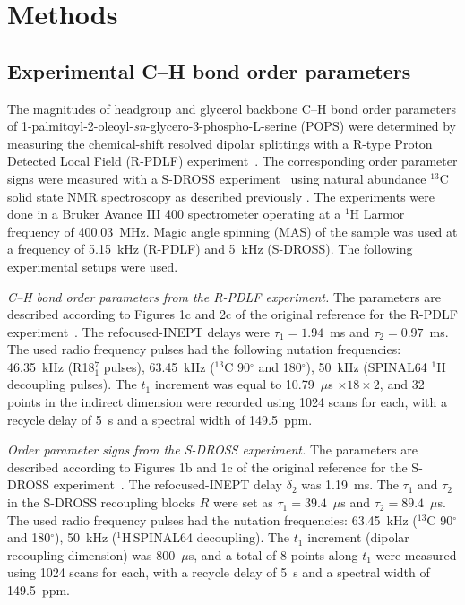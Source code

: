 \documentclass[journal=jpcbfk,manuscript=article]{achemso}
\begin{document}
\section{Methods}

\subsection{Experimental C--H bond order parameters}

The magnitudes of headgroup and glycerol backbone C--H bond order parameters of 1-palmitoyl-2-oleoyl-{\it sn}-glycero-3-phospho-L-serine (POPS)
were determined by measuring the chemical-shift resolved dipolar splittings
with a R-type Proton Detected Local Field (R-PDLF) experiment~\cite{dvinskikh04}.
The corresponding order parameter signs were measured with a S-DROSS experiment~\cite{gross97}
using natural abundance $^{13}$C solid state NMR spectroscopy as described previously \cite{ferreira13,ferreira16}.
The experiments were done in a Bruker Avance III 400 spectrometer operating at a $^1$H Larmor frequency of 400.03~MHz.
Magic angle spinning (MAS) of the sample was used at a frequency of 5.15~kHz (R-PDLF) and 5~kHz (S-DROSS).
The following experimental setups were used.

{\emph{C--H bond order parameters from the R-PDLF experiment.}} The parameters are described according to Figures 1c and 2c of the original reference
for the R-PDLF experiment~\cite{dvinskikh04}.  The refocused-INEPT delays were $\tau_1=1.94$~ms and $\tau_2=0.97$~ms.
The used radio frequency pulses had the following nutation frequencies: 46.35~kHz (R18$^7_1$ pulses), 63.45~kHz ($^{13}$C 90$^{\circ}$ and 180$^{\circ}$),
50~kHz (SPINAL64 $^1$H decoupling pulses).
The $t_1$ increment was equal to 10.79~$\mu$s $\times18\times2$, and 32 points in the indirect
dimension were recorded using 1024 scans for each, with a recycle delay of 5~s and a spectral width of 149.5~ppm.

\emph{Order parameter signs from the S-DROSS experiment.}
The parameters are described according to Figures 1b and 1c of the original reference for the S-DROSS
experiment~\cite{gross97}. The refocused-INEPT delay $\delta_2$ was 1.19~ms. The $\tau_1$ and $\tau_2$ in the S-DROSS recoupling
blocks $R$ were set as $\tau_1=39.4$~$\mu$s and $\tau_2=89.4$~$\mu$s. The used radio frequency pulses had the nutation
frequencies: 63.45~kHz ($^{13}$C 90$^{\circ}$ and 180$^{\circ}$), 50~kHz ($^1$H\,SPINAL64 decoupling).
The $t_1$ increment (dipolar recoupling dimension) was 800~$\mu$s, and a total of 8 points along $t_1$ were
measured using 1024 scans for each, with a recycle delay of 5~s and a spectral width of 149.5~ppm.
\end{document}

